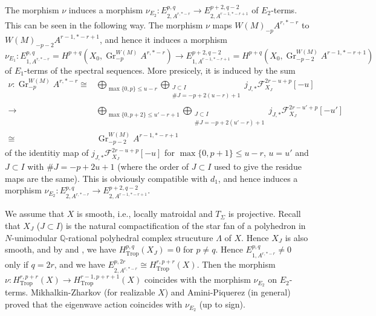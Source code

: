 \documentclass[12pt,a4]{amsart}
\def\Q{\mathbb{Q}}
\def\F{\mathscr{F}}
\def\Gr{\mathop{\mathrm{Gr}}\nolimits}
\def\Trop{\mathop{\mathrm{trop}}\nolimits}
\def\Trop{\mathop{\mathrm{Trop}}\nolimits}
\def\Gr{\mathop{\mathrm{Gr}}\nolimits}
\numberwithin{equation}{section}
\numberwithin{figure}{section}
\begin{document}
  The morphism
  $\nu $ induces a morphism 
  $ \nu_{E_2} \colon E_{2, A^{r,*-r}}^{p,q}  
  \to 
   E_{2, A^{r-1,*-r+1}}^{p+2,q-2}  
  $ of $E_2$-terms. This can be seen in the following way.
  The morphism $\nu$ maps $W(M)_{-p} A^{r,*-r}$ to $W(M)_{-p-2} A^{r-1,*-r+1} $, 
   and 
    hence it induces a morphism
  $$ \nu_{E_1} \colon E_{1, A^{r,*-r}}^{p,q} = 
          H^{p+q} (X_0, \Gr^{W(M)}_{-p} A^{r,*-r}  ) 
  \to 
   E_{1, A^{r-1,*-r+1}}^{p+2,q-2} = 
         H^{p+q} (X_0, \Gr^{W(M)}_{-p-2} A^{r-1,*-r+1}  ) 
  $$
    of $E_1$-terms
    of the spectral sequences.
  More presicely, it is induced by 
  the sum
  \begin{align*}
   \nu \colon 
   \Gr^{W(M)}_{-p} A^{r,*-r} 
   \cong &  
    \bigoplus_{ \max \{0, p \} \leq u-r  }
    \bigoplus_{\substack{ J \subset I \\ \# J = -p + 2(u-r)+1 } }
     j_{J,*} \F_{X_{J}}^{2r-u+p}  [-u]  \\
      \to  & 
    \bigoplus_{ \max \{0, p +2 \} \leq u' -r+1 }
    \bigoplus_{\substack{ J \subset I \\ \# J = -p + 2(u'-r)+1 } }
     j_{J,*} \F_{X_{J}}^{2r-u'+p}  [-u'] \\
   \cong &  
   \Gr^{W(M)}_{-p-2} A^{r-1,*-r+1}  
  \end{align*} 
  of the identitiy map 
  of $j_{J,*} \F_{X_{J}}^{2r-u+p}  [-u]$
  for $\max \{0,p+1 \} \leq u -r$, $u=u'$ and $J \subset I $ with $ \# J = -p + 2u+1 $
  (where the order of $J\subset I$
    used to give the residue maps are the same).
  This is obviously compatible with $d_1$, and hence induces a morphism 
  $ \nu_{E_2} \colon E_{2, A^{r,*-r}}^{p,q}  
  \to 
   E_{2, A^{r-1,*-r+1}}^{p+2,q-2} . 
  $

  We assume that $X$ is smooth, i.e., locally matroidal and $T_{\Sigma}$ is projective.
   Recall that 
   $X_J$ ($J \subset I$) is the natural compactification of the star fan of a polyhedron in
   $N$-unimodular $\Q$-rational 
    polyhedral complex strucuture $\Lambda$ of $X$.
     Hence $X_J$ is also smooth, 
   and by \cite[Theorem 1.1]{AminiPiquerezTropicalFeichtner-Yuzvinskyandpositivitycriterionforfans2024} and \cite[Theorem 2]{JellShawSmackaSuperformstropicalcohomologyandPoincarduality2019}, 
    we have $H^{p,q}_{\Trop} (X_J) =0$ for $p \neq q$.
   Hence $E_{1, A^{r,*-r}}^{p,q} \neq 0 $ only if $q=2r$, 
   and 
   we have 
   $E_{2, A^{r,*-r}}^{p,2r} \cong H^{r,p+r}_{\Trop }(X)$. 
   Then 
   the morphism
   $\nu  \colon H^{r,p+r}_{\Trop }(X)
     \to  H^{r-1,p+r+1}_{\Trop }(X)$ 
   coincides with the morphism $ \nu_{E_2}  $ on $E_2$-terms.
   Mikhalkin-Zharkov \cite[Proof of Theorem 3]{MikhalkinZharkovTropicaleignewaveandintermediatejacobians2014} (for realizable $X$)
  and Amini-Piquerez \cite[Corollary 6.21]{AminiPiquerezHodgetheoryfortropicalvarieties2020}(in general)
  proved that the eigenwave action coincides with 
   $ \nu_{E_2} $ (up to sign).
\end{document}
